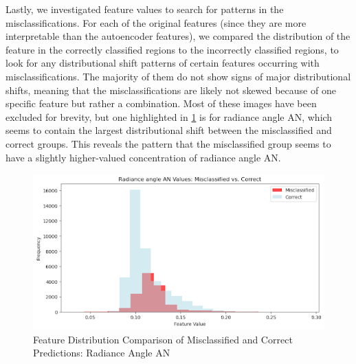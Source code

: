 \documentclass[10pt,letterpaper]{article}
\begin{document}
Lastly, we investigated feature values to search for patterns in the misclassifications. For each of the original features (since they are more interpretable than the autoencoder features), we compared the distribution of the feature in the correctly classified regions to the incorrectly classified regions, to look for any distributional shift patterns of certain features occurring with misclassifications. The majority of them do not show signs of major distributional shifts, meaning that the misclassifications are likely not skewed because of one specific feature but rather a combination. Most of these images have been excluded for brevity, but one highlighted in \ref{fig:radiance_angle_an_dist_comparison} is for radiance angle AN, which seems to contain the largest distributional shift between the misclassified and correct groups. This reveals the pattern that the misclassified group seems to have a slightly higher-valued concentration of radiance angle AN.

\begin{figure}[ht]
    \centering
    \includegraphics[width=0.5\linewidth]{figs/radiance_angle_AN_dist_comparison.png}
    \caption{Feature Distribution Comparison of Misclassified and Correct Predictions: Radiance Angle AN}
    \label{fig:radiance_angle_an_dist_comparison}
\end{figure}
\end{document}
